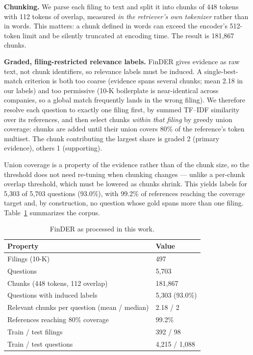 \documentclass[conference]{IEEEtran}
\begin{document}
\textbf{Chunking.} We parse each filing to text and split it into chunks of 448
tokens with 112 tokens of overlap, measured \emph{in the retriever's own
tokenizer} rather than in words. This matters: a chunk defined in words can
exceed the encoder's 512-token limit and be silently truncated at encoding
time. The result is 181{,}867 chunks.

\textbf{Graded, filing-restricted relevance labels.} FinDER gives evidence as
raw text, not chunk identifiers, so relevance labels must be induced. A
single-best-match criterion is both too coarse (evidence spans several chunks;
mean 2.18 in our labels) and too permissive (10-K boilerplate is near-identical
across companies, so a global match frequently lands in the wrong filing). We
therefore resolve each question to exactly one filing first, by summed TF--IDF
similarity over its references, and then select chunks \emph{within that filing}
by greedy union coverage: chunks are added until their union covers 80\% of the
reference's token multiset. The chunk contributing the largest share is graded
2 (primary evidence), others 1 (supporting).

Union coverage is a property of the evidence rather than of the chunk size, so
the threshold does not need re-tuning when chunking changes --- unlike a
per-chunk overlap threshold, which must be lowered as chunks shrink. This
yields labels for 5{,}303 of 5{,}703 questions (93.0\%), with 99.2\% of
references reaching the coverage target and, by construction, no question whose
gold spans more than one filing. Table~\ref{tab:dataset} summarizes the corpus.

\begin{table}[t]
\caption{FinDER as processed in this work.}
\label{tab:dataset}
\centering
\small
\begin{tabular}{ll}
\toprule
Property & Value \\
\midrule
Filings (10-K) & 497 \\
Questions & 5{,}703 \\
Chunks (448 tokens, 112 overlap) & 181{,}867 \\
Questions with induced labels & 5{,}303 (93.0\%) \\
Relevant chunks per question (mean / median) & 2.18 / 2 \\
References reaching 80\% coverage & 99.2\% \\
Train / test filings & 392 / 98 \\
Train / test questions & 4{,}215 / 1{,}088 \\
\bottomrule
\end{tabular}
\end{table}
\end{document}

